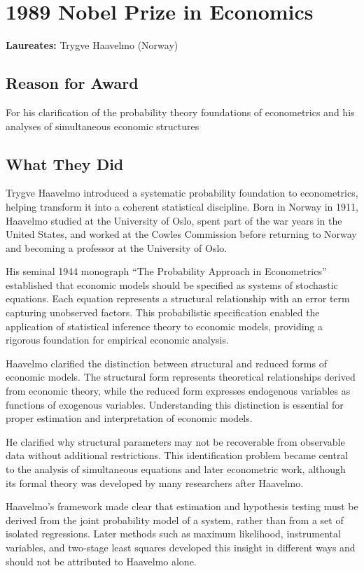 \chapter{1989 Nobel Prize in Economics}
\textbf{Laureates: }Trygve Haavelmo (Norway)

\section*{Reason for Award}
For his clarification of the probability theory foundations of econometrics and
his analyses of simultaneous economic structures

\section{What They Did}
Trygve Haavelmo introduced a systematic probability foundation to econometrics,
helping transform it into a coherent statistical discipline. Born in Norway
in 1911, Haavelmo studied at the University of Oslo, spent part of the war
years in the United States, and worked at the Cowles Commission before
returning to Norway and becoming a professor at the University of Oslo.

His seminal 1944 monograph ``The Probability Approach in Econometrics'' established
that economic models should be specified as systems of stochastic equations.
Each equation represents a structural relationship with an error term capturing
unobserved factors. This probabilistic specification enabled the application
of statistical inference theory to economic models, providing a rigorous
foundation for empirical economic analysis.

Haavelmo clarified the distinction between structural and reduced forms of
economic models. The structural form represents theoretical relationships
derived from economic theory, while the reduced form expresses endogenous
variables as functions of exogenous variables. Understanding this distinction
is essential for proper estimation and interpretation of economic models.

He clarified why structural parameters may not be recoverable from observable
data without additional restrictions. This identification problem became
central to the analysis of simultaneous equations and later econometric work,
although its formal theory was developed by many researchers after Haavelmo.

Haavelmo's framework made clear that estimation and hypothesis testing must be
derived from the joint probability model of a system, rather than from a set of
isolated regressions. Later methods such as maximum likelihood, instrumental
variables, and two-stage least squares developed this insight in different
ways and should not be attributed to Haavelmo alone.

